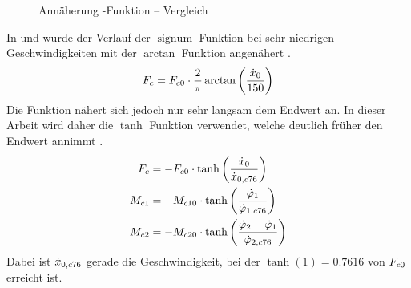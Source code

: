 \begin{figure}[b]
	\caption{Annäherung -Funktion -- Vergleich}
	\label{fig:sign}
\end{figure}

In \cite{chang} und \cite{kisner} wurde der Verlauf der $\operatorname{signum}$-Funktion bei sehr niedrigen Geschwindigkeiten mit der $\arctan$ Funktion angenähert .
	\[
		F_c=F_{c0} \cdot \frac{2}{\pi} \arctan \left(\frac{\dot{x}_0}{150}\right)
\]
Die Funktion nähert sich jedoch nur sehr langsam dem Endwert an.
In dieser Arbeit wird daher die $\tanh$ Funktion verwendet, welche deutlich früher den Endwert annimmt .
%
\begin{subequations} \begin{align}
	F_c  &= -F_{c0}  \cdot \tanh{\left(\frac{\ensuremath{\dot{x}_0}}{\ensuremath{\dot{x}_{0,c76}}}\right)}  \\
	M_{c1} &= -M_{c10} \cdot \tanh{\left(\frac{\ensuremath{\dot{\varphi}_1}}{\ensuremath{\dot{\varphi}_{1,c76}}}\right)}  \\
	M_{c2} &= -M_{c20} \cdot \tanh{\left(\frac{\ensuremath{\dot{\varphi}_2}-\ensuremath{\dot{\varphi}_1}}{\ensuremath{\dot{\varphi}_{2,c76}}}\right)}
 \end{align} \end{subequations}
Dabei ist $\dot{x}_{0,c76}$ gerade die Geschwindigkeit, bei der $\tanh(1)=0.7616$ von $F_{c0}$ erreicht ist.



